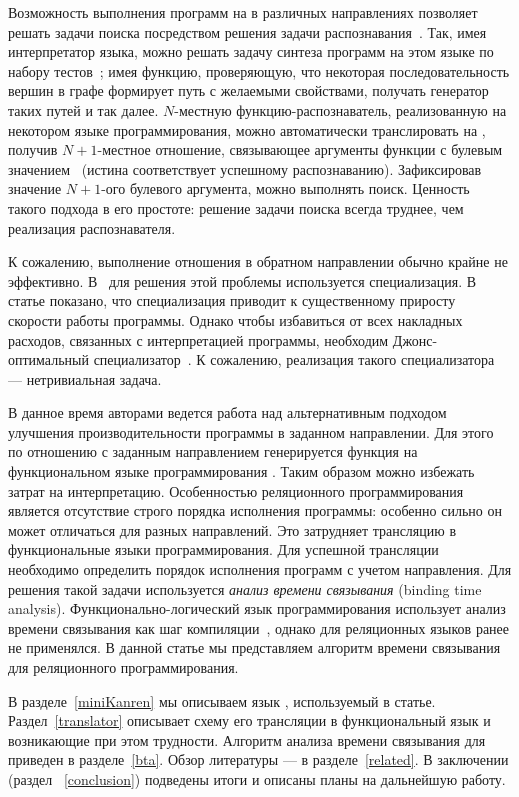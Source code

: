 \documentclass[conference,american,russian]{IEEEtran}
\begin{document}
Возможность выполнения программ на \miniKanren{} в различных направлениях позволяет решать задачи поиска посредством решения задачи распознавания~\cite{lozov2019relational}.
Так, имея интерпретатор языка, можно решать задачу синтеза программ на этом языке по набору тестов~\cite{byrd2017unified}; имея функцию, проверяющую, что некоторая последовательность вершин в графе формирует путь с желаемыми свойствами, получать генератор таких путей и так далее. 
$N$-местную функцию-распознаватель, реализованную на некотором языке программирования, можно автоматически транслировать на \miniKanren{}, получив $N+1$-местное отношение, связывающее аргументы функции с булевым значением~\cite{lozov2019relational} (истина соответствует успешному распознаванию). 
Зафиксировав значение $N+1$-ого булевого аргумента, можно выполнять поиск. 
Ценность такого подхода в его простоте: решение задачи поиска всегда труднее, чем реализация распознавателя. 

К сожалению, выполнение отношения в обратном направлении обычно крайне не эффективно. 
В~\cite{lozov2019relational} для решения этой проблемы используется специализация. 
В статье показано, что специализация приводит к существенному приросту скорости работы программы.
Однако чтобы избавиться от всех накладных расходов, связанных с интерпретацией программы, необходим Джонс-оптимальный специализатор~\cite{jones1993partial}. 
К сожалению, реализация такого специализатора --- нетривиальная задача.

В данное время авторами ведется работа над альтернативным подходом улучшения производительности программы в заданном направлении. 
Для этого по отношению с заданным направлением генерируется функция на функциональном языке программирования \haskell{}. 
Таким образом можно избежать затрат на интерпретацию. 
Особенностью реляционного программирования является отсутствие строго порядка исполнения программы: особенно сильно он может отличаться для разных направлений.
Это затрудняет трансляцию в функциональные языки программирования. 
Для успешной трансляции необходимо определить порядок исполнения программ с учетом направления. 
Для решения такой задачи используется \textit{анализ времени связывания} (binding time analysis). 
Функционально-логический язык программирования \mercury{} использует анализ времени связывания как шаг компиляции~\cite{vanhoof2004binding}, однако для реляционных языков ранее не применялся.
В данной статье мы представляем алгоритм времени связывания для реляционного программирования. 

В разделе~\ref{miniKanren} мы описываем язык \miniKanren{}, используемый в статье.
Раздел~\ref{translator} описывает схему его трансляции в функциональный язык и возникающие при этом трудности.
Алгоритм анализа времени связывания для \miniKanren{} приведен в разделе~\ref{bta}. 
Обзор литературы --- в разделе~\ref{related}.
В заключении (раздел ~\ref{conclusion}) подведены итоги и описаны планы на дальнейшую работу. 
\end{document}
